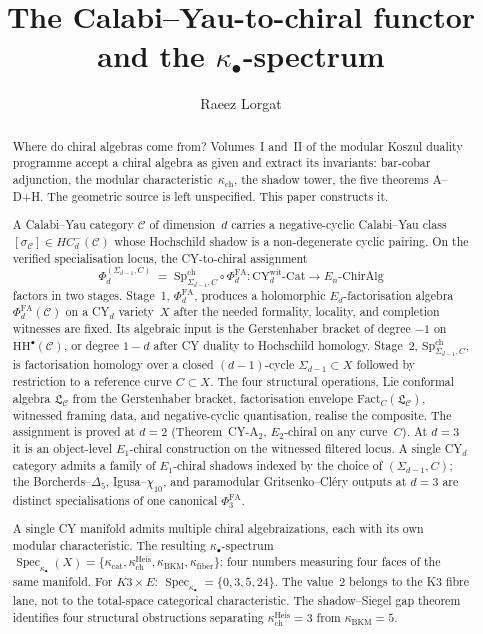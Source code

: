 \documentclass[11pt]{article}
\title{The Calabi--Yau-to-chiral functor\\
and the $\kappa_\bullet$-spectrum}
\author{Raeez Lorgat}
\date{}
\theoremstyle{plain}
\theoremstyle{definition}
\theoremstyle{remark}
\newcommand{\fL}{\mathfrak{L}}
\newcommand{\cC}{\mathcal{C}}
\newcommand{\Eone}{E_1}
\newcommand{\Etwo}{E_2}
\newcommand{\En}{E_n}
\newcommand{\HH}{\mathrm{HH}}
\newcommand{\Fact}{\mathrm{Fact}}
\newcommand{\CY}{\mathrm{CY}}
\newcommand{\SpCh}{\mathrm{Sp}^{\mathrm{ch}}}
\DeclareMathOperator{\Spec}{Spec}
\begin{document}
\maketitle


\begin{abstract}
Where do chiral algebras come from?  Volumes~I and~II of the
modular Koszul duality programme accept a chiral algebra as given
and extract its invariants: bar-cobar adjunction, the modular
characteristic~$\kappa_{\mathrm{ch}}$, the shadow tower, the five
theorems A--D+H.  The geometric source is left unspecified.  This
paper constructs it.

A Calabi--Yau category $\cC$ of dimension~$d$ carries a
negative-cyclic Calabi--Yau class
$[\sigma_\cC]\in HC^{-}_{d}(\cC)$ whose Hochschild shadow is a
non-degenerate cyclic pairing.  On the verified specialisation locus,
the CY-to-chiral assignment
\[
 \Phi_d^{(\Sigma_{d-1},C)} \;=\; \SpCh_{\Sigma_{d-1}, C} \circ \Phi^{\mathrm{FA}}_d
 \colon \CY_d^{\mathrm{wit}}\text{-}\mathrm{Cat} \longrightarrow
 \En\text{-}\mathrm{ChirAlg}
\]
factors in two stages. Stage~1, $\Phi^{\mathrm{FA}}_d$, produces a
holomorphic $E_d$-factorisation algebra
$\Phi^{\mathrm{FA}}_d(\cC)$ on a CY$_d$ variety~$X$ after the needed
formality, locality, and completion witnesses are fixed.  Its algebraic
input is the Gerstenhaber bracket of degree $-1$ on
$\HH^\bullet(\cC)$, or degree $1-d$ after CY duality to Hochschild
homology. Stage~2,
$\SpCh_{\Sigma_{d-1}, C}$, is factorisation homology over a
closed $(d-1)$-cycle $\Sigma_{d-1} \subset X$ followed by restriction
to a reference curve $C \subset X$. The four structural operations,
Lie conformal algebra $\fL_\cC$ from the Gerstenhaber bracket,
factorisation envelope $\Fact_C(\fL_\cC)$, witnessed framing data, and
negative-cyclic quantisation, realise the composite. The assignment is
proved at $d = 2$ (Theorem~CY-A$_2$, $\Etwo$-chiral on any curve~$C$).
At $d = 3$ it is an object-level $\Eone$-chiral construction on the
witnessed filtered locus. A single CY$_d$ category admits a family of
$\Eone$-chiral shadows indexed by the choice of $(\Sigma_{d-1}, C)$;
the Borcherds--$\Delta_5$, Igusa--$\chi_{10}$, and paramodular
Gritsenko--Cl\'ery outputs at $d = 3$ are distinct specialisations of
one canonical $\Phi^{\mathrm{FA}}_3$.

A single CY manifold admits multiple chiral algebraizations, each
with its own modular characteristic.  The resulting
$\kappa_\bullet$-spectrum
$\Spec_{\kappa_\bullet}(X) = \{\kappa_{\mathrm{cat}},
\kappa_{\mathrm{ch}}^{\mathrm{Heis}}, \kappa_{\mathrm{BKM}},
\kappa_{\mathrm{fiber}}\}$: four numbers measuring four faces of
the same manifold.  For $K3 \times E$:
$\Spec_{\kappa_\bullet} = \{0, 3, 5, 24\}$. The value~$2$ belongs to
the K3 fibre lane, not to the total-space categorical characteristic.
The shadow--Siegel
gap theorem identifies four structural obstructions separating
$\kappa_{\mathrm{ch}}^{\mathrm{Heis}} = 3$ from $\kappa_{\mathrm{BKM}} = 5$.


\end{abstract}
\end{document}
